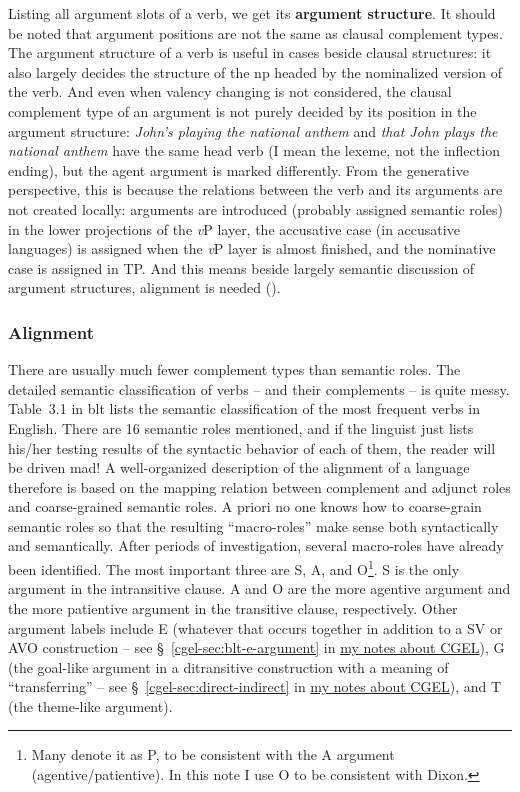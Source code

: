 \documentclass[UTF8, a4paper, oneside, scheme=plain]{ctexart}
\newcommand*{\citesec}[1]{\S~{#1}}
\newcommand*{\citetable}[1]{Table~{#1}}
\newcommand*{\concept}[1]{\textbf{#1}}
\newcommand*{\corpus}[1]{\emph{#1}}
\newcommand*{\vP}{\textit{v}P}
\newcommand{\cgel}{\href{../English/cambridge.pdf}{my notes about CGEL}}
\begin{document}
Listing all argument slots of a verb,
we get its \concept{argument structure}.
It should be noted that argument positions are not the same as clausal complement types.
The argument structure of a verb 
is useful in cases beside clausal structures:
it also largely decides the structure of the \ac{np} headed by the nominalized version of the verb.
And even when valency changing is not considered, 
the clausal complement type of an argument is not purely decided by its position in the argument structure:
\corpus{John's playing the national anthem} and \corpus{that John plays the national anthem}
have the same head verb (I mean the lexeme, not the inflection ending),
but the agent argument is marked differently.
From the generative perspective,
this is because the relations between the verb and its arguments 
are not created locally:
arguments are introduced (probably assigned semantic roles)
in the lower projections of the \vP{} layer,
the accusative case (in accusative languages) is assigned when the \vP{} layer is almost finished,
and the nominative case is assigned in TP.
And this means beside largely semantic discussion of argument structures,
alignment is needed ().

\subsubsection{Alignment}

There are usually much fewer complement types than semantic roles.
The detailed semantic classification of verbs -- and their complements -- is quite messy. 
\citetable{3.1} in \ac{blt} lists the semantic classification of the most frequent verbs in English.
There are 16 semantic roles mentioned, 
and if the linguist just lists his/her testing results of the syntactic behavior of each of them,
the reader will be driven mad!
A well-organized description of the alignment of a language therefore is based on 
the mapping relation between complement and adjunct roles and coarse-grained semantic roles.
A priori no one knows how to coarse-grain semantic roles 
so that the resulting ``macro-roles'' make sense both syntactically and semantically.
After periods of investigation, several macro-roles have already been identified.
The most important three are S, A, and O\footnote{
    Many denote it as P, to be consistent with the A argument (agentive/patientive). 
    In this note I use O to be consistent with Dixon.
}.
S is the only argument in the intransitive clause.
A and O are the more agentive argument and the more patientive argument in the transitive clause, 
respectively.
Other argument labels include E 
(whatever that occurs together in addition to a SV or AVO construction
-- see \citesec{\ref{cgel-sec:blt-e-argument}} in \cgel),
G (the goal-like argument in a ditransitive construction with a meaning of ``transferring''
-- see \citesec{\ref{cgel-sec:direct-indirect}} in \cgel),
and T (the theme-like argument).
\end{document}
